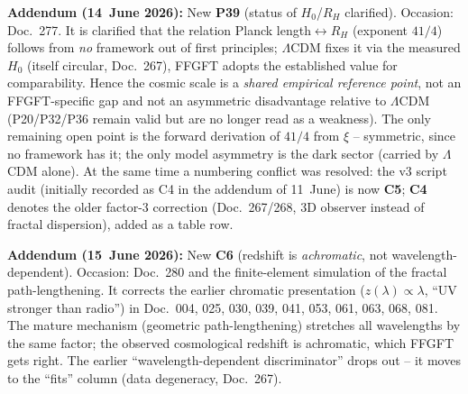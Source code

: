 \textbf{Addendum (14~June 2026):} New \textbf{P39} (status of $H_0$/$R_H$
clarified). Occasion: Doc.~277. It is clarified that the relation Planck
length$\leftrightarrow R_H$ (exponent $41/4$) follows from \emph{no} framework
out of first principles; $\Lambda$CDM fixes it via the measured $H_0$ (itself
circular, Doc.~267), FFGFT adopts the established value for comparability.
Hence the cosmic scale is a \emph{shared empirical reference point}, not an
FFGFT-specific gap and not an asymmetric disadvantage relative to $\Lambda$CDM
(P20/P32/P36 remain valid but are no longer read as a weakness). The only
remaining open point is the forward derivation of $41/4$ from $\xi$ --
symmetric, since no framework has it; the only model asymmetry is the dark
sector (carried by $\Lambda$CDM alone). At the same time a numbering conflict
was resolved: the v3 script audit (initially recorded as C4 in the addendum of
11~June) is now \textbf{C5}; \textbf{C4} denotes the older factor-3 correction
(Doc.~267/268, 3D observer instead of fractal dispersion), added as a table
row.

\textbf{Addendum (15~June 2026):} New \textbf{C6} (redshift is \emph{achromatic},
not wavelength-dependent). Occasion: Doc.~280 and the finite-element simulation of
the fractal path-lengthening. It corrects the earlier chromatic presentation
($z(\lambda)\propto\lambda$, \enquote{UV stronger than radio}) in Doc.~004, 025,
030, 039, 041, 053, 061, 063, 068, 081. The mature mechanism (geometric
path-lengthening) stretches all wavelengths by the same factor; the observed
cosmological redshift is achromatic, which FFGFT gets right. The earlier
\enquote{wavelength-dependent discriminator} drops out -- it moves to the
\enquote{fits} column (data degeneracy, Doc.~267).

